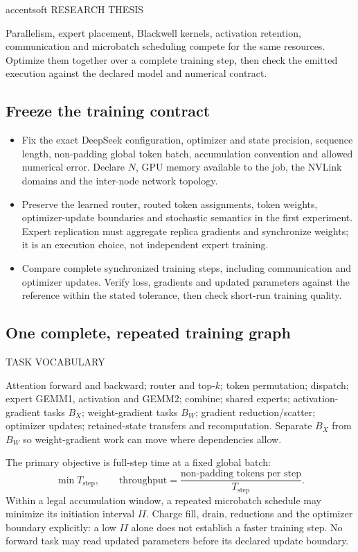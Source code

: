 \documentclass[10pt]{article}
\newcommand{\mono}{\ttfamily}
\newenvironment{callA}{\begin{callbox}[accent]{accentsoft}}{\end{callbox}}
\newcommand{\ct}[1]{{\mono\fontsize{7.2}{8}\selectfont\color{ink2}\MakeUppercase{#1}}\par\vspace{2pt}}
\newenvironment{tight}
  {\begin{itemize}[leftmargin=13pt,itemsep=4pt,topsep=4pt,parsep=0pt,
     label=\textcolor{ink3}{\footnotesize$\bullet$}]\color{ink2}}
  {\end{itemize}}
\begin{document}
\begin{callA}
\ct{Research thesis}
Parallelism, expert placement, Blackwell kernels, activation retention,
communication and microbatch scheduling compete for the same resources.
Optimize them together over a complete training step, then check the emitted
execution against the declared model and numerical contract.
\end{callA}

\subsection{Freeze the training contract}
\begin{tight}
\item Fix the exact DeepSeek configuration, optimizer and state precision,
sequence length, non-padding global token batch, accumulation convention and
allowed numerical error. Declare $N$, GPU memory available to the job, the
NVLink domains and the inter-node network topology.
\item Preserve the learned router, routed token assignments, token weights,
optimizer-update boundaries and stochastic semantics in the first experiment.
Expert replication must aggregate replica gradients and synchronize weights;
it is an execution choice, not independent expert training.
\item Compare complete synchronized training steps, including communication
and optimizer updates. Verify loss, gradients and updated parameters against
the reference within the stated tolerance, then check short-run training quality.
\end{tight}

\subsection{One complete, repeated training graph}
\begin{card}
\ct{Task vocabulary}
Attention forward and backward; router and top-$k$; token permutation;
dispatch; expert GEMM1, activation and GEMM2; combine; shared experts;
activation-gradient tasks $B_X$; weight-gradient tasks $B_W$; gradient
reduction/scatter; optimizer updates; retained-state transfers and recomputation.
Separate $B_X$ from $B_W$ so weight-gradient work can move where dependencies allow.
\end{card}
The primary objective is full-step time at a fixed global batch:
\[
 \min T_{\mathrm{step}},\qquad
 \mathrm{throughput}=\frac{\text{non-padding tokens per step}}{T_{\mathrm{step}}}.
\]
Within a legal accumulation window, a repeated microbatch schedule may minimize
its initiation interval $II$. Charge fill, drain, reductions and the optimizer
boundary explicitly: a low $II$ alone does not establish a faster training step.
No forward task may read updated parameters before its declared update boundary.
\end{document}
